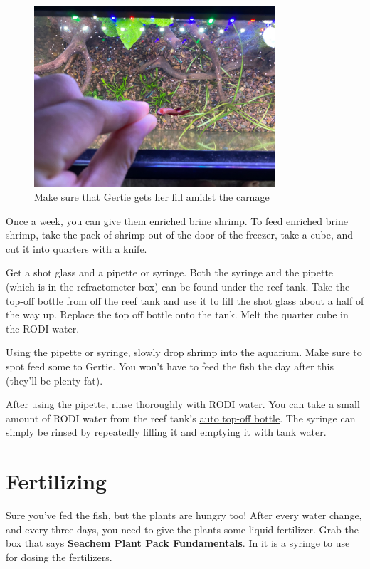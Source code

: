 \documentclass{report}
\begin{document}
\begin{figure}[H]
    \centering
    \includegraphics[width=0.8\textwidth]{FeedGertie.jpg}
    \caption{Make sure that Gertie gets her fill amidst the carnage}
\end{figure}

Once a week, you can give them enriched brine shrimp. To feed enriched brine shrimp, take the pack of shrimp out of the door
of the freezer, take a cube, and cut it into quarters with a knife. 

Get a shot glass and a pipette or syringe. Both the syringe and the pipette (which is in the refractometer box) can be found under the reef tank. Take the top-off bottle from off the reef tank and use it to fill the shot glass
about a half of the way up. Replace the top off bottle onto the tank. Melt the quarter cube in the RODI water. 

Using the pipette or syringe, slowly drop shrimp into the aquarium. Make sure to spot feed some to Gertie. You won't have to 
feed the fish the day after this (they'll be plenty fat).

After using the pipette, rinse thoroughly with RODI water. You can take a small amount of RODI water from the reef tank's \hyperref[sec:ato]{auto top-off bottle}. The syringe can simply be rinsed by repeatedly filling it and emptying it with tank water.

\section{Fertilizing}
Sure you've fed the fish, but the plants are hungry too! After every water change, and every three days, you need to give the
plants some liquid fertilizer. Grab the box that says \textbf{Seachem Plant Pack Fundamentals}. In it is a syringe to use for
dosing the fertilizers. 
\end{document}
